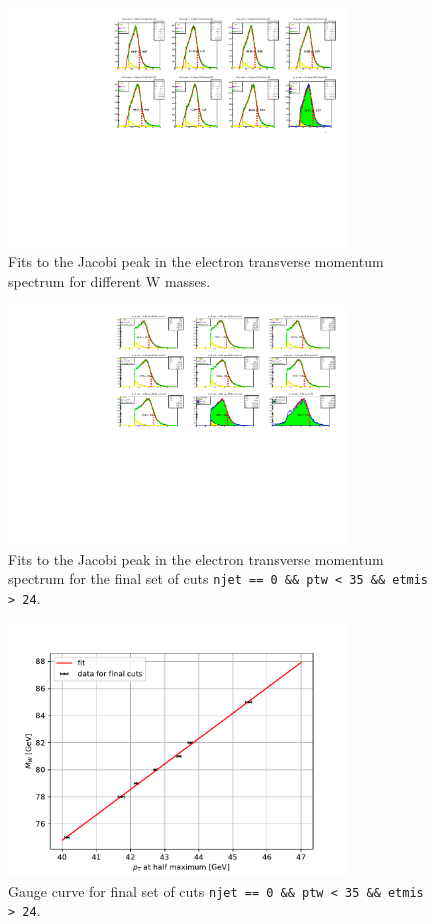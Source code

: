 \begin{figure}
    \centering
    \includegraphics[width=0.8\textwidth]{../W_mass/gauge_curve_cuts1.pdf}
    \caption{Fits to the Jacobi peak in the electron transverse momentum spectrum for different
    W masses.}
    \label{fig:gauge_curve_cuts1}
\end{figure}



\begin{figure}
    \centering
    \includegraphics[width=0.8\textwidth]{../W_mass/gauge_curve_etmis24.pdf}
    \caption{Fits to the Jacobi peak in the electron transverse momentum spectrum for the final set of cuts \texttt{njet == 0 \&\& ptw < 35 \&\& etmis > 24}.}
    \label{fig:Jacobi-final}
\end{figure}

\begin{figure}
    \centering
    \includegraphics[width=0.8\textwidth]{../W_mass/final_gauge_curv.pdf}
    \caption{Gauge curve for final set of cuts \texttt{njet == 0 \&\& ptw < 35 \&\& etmis > 24}.}
    \label{fig:gauge_final}
\end{figure}